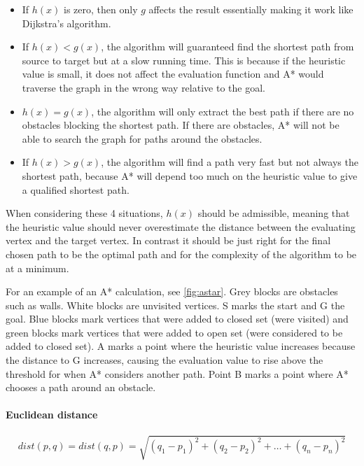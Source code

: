     \begin{itemize}
    \item If $h(x)$ is zero, then only $g$ affects the result essentially making it work like Dijkstra's algorithm.

    \item If $h(x) < g(x)$, the algorithm will guaranteed find the shortest path from source to target but at a slow running time. This is because if the heuristic value is small, it does not affect the evaluation function and A* would traverse the graph in the wrong way relative to the goal.

    \item $h(x) = g(x)$, the algorithm will only extract the best path if there are no obstacles blocking the shortest path. If there are obstacles, A* will not be able to search the graph for paths around the obstacles.

    \item If $h(x) > g(x)$, the algorithm will find a path very fast but not always the shortest path, because A* will depend too much on the heuristic value to give a qualified shortest path.
  \end{itemize}

  When considering these 4 situations, $h(x)$ should be admissible, meaning that the heuristic value should never overestimate the distance between the evaluating vertex and the target vertex. In contrast it should be just right for the final chosen path to be the optimal path and for the complexity of the algorithm to be at a minimum. 

  For an example of an A* calculation, see \cref{fig:astar}. 
  Grey blocks are obstacles such as walls. White blocks are unvisited vertices. S marks the start and G the goal. Blue blocks mark vertices that were added to closed set (were visited) and green blocks mark vertices that were added to open set (were considered to be added to closed set). A marks a point where the heuristic value increases because the distance to G increases, causing the evaluation value to rise above the threshold for when A* considers another path. Point B marks a point where A* chooses a path around an obstacle.

  \paragraph{Euclidean distance}\cite{wiki_euclidean}

  \[
    dist(p, q) = dist(q, p) = \sqrt{(q_{1} - p_{1})^2 + (q_{2} - p_{2})^2 + \dots + (q_{n} - p_{n})^2}
  \]

